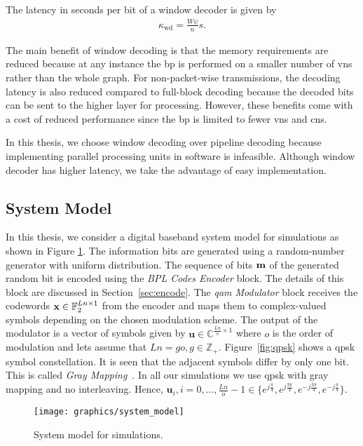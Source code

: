 The latency in seconds per bit of a window decoder is given by
\begin{align}
\kappa_{\text{wd}}=\frac{W\psi}{n}s.
\end{align}

The main benefit of window decoding is that the memory requirements are reduced because at any instance the \ac{bp} is performed on a smaller number of \acp{vn} rather than the whole graph. For non-packet-wise transmissions, the decoding latency is also reduced compared to full-block decoding because the decoded bits can be sent to the higher layer for processing. However, these benefits come with a cost of reduced performance since the \ac{bp} is limited to fewer \acp{vn} and \acp{cn}.

In this thesis, we choose window decoding over pipeline decoding because implementing parallel processing units in software is infeasible. Although window decoder has higher latency, we take the advantage of easy implementation.

\subsection{System Model}\label{sec:sys_mod}
In this thesis, we consider a digital baseband system model for simulations as shown in Figure \ref{fig:system}. The information bits are generated using a random-number generator with uniform distribution. The sequence of bits $\mathbf{m}$ of the generated random bit is encoded using the \emph{BPL Codes Encoder} block. The details of this block are discussed in Section~\ref{sec:encode}. The \emph{\ac{qam} Modulator} block receives the codewords $\mathbf{x}\in\mathbb{F}_2^{Ln\times 1}$ from the encoder and maps them to complex-valued symbols depending on the chosen modulation scheme. The output of the modulator is a vector of symbols given by $\mathbf{u}\in\mathbb{C}^{\frac{Ln}{o}\times 1}$ where $o$ is the order of modulation and lets assume that $Ln=go, g\in\mathbb{Z}_+$. Figure~\ref{fig:qpsk} shows a \ac{qpsk} symbol constellation. It is seen that the adjacent symbols differ by only one bit. This is called \emph{Gray Mapping}~\cite{proak}. In all our simulations we use \ac{qpsk} with gray mapping and no interleaving. Hence, $\mathbf{u}_i,i=0,\dots,\frac{Ln}{o}-1\in\{e^{j\frac{\pi}{4}},e^{j\frac{3\pi}{4}},e^{-j\frac{3\pi}{4}},e^{-j\frac{\pi}{4}}\}$.
\begin{figure}[htbp]
  \centering
  \texttt{[image: graphics/system\_model]}
  \caption{System model for simulations.}
  \label{fig:system}
\end{figure}

